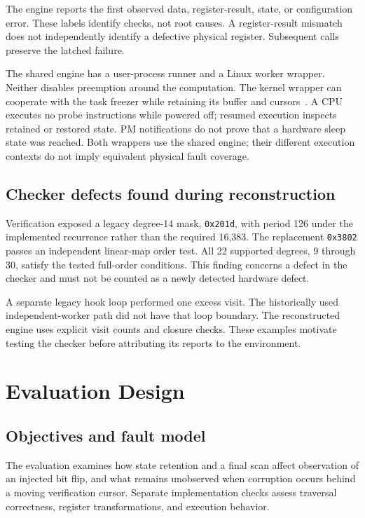 \documentclass[10pt,twocolumn,letterpaper]{article}
\newcommand{\code}[1]{\texttt{#1}}
\begin{document}
The engine reports the first observed data, register-result, state, or configuration error. These labels identify checks, not root causes. A register-result mismatch does not independently identify a defective physical register. Subsequent calls preserve the latched failure.

The shared engine has a user-process runner and a Linux worker wrapper. Neither disables preemption around the computation. The kernel wrapper can cooperate with the task freezer while retaining its buffer and cursors~\cite{linuxfreezer}. A CPU executes no probe instructions while powered off; resumed execution inspects retained or restored state. PM notifications do not prove that a hardware sleep state was reached. Both wrappers use the shared engine; their different execution contexts do not imply equivalent physical fault coverage.

\subsection{Checker defects found during reconstruction}
Verification exposed a legacy degree-14 mask, \code{0x201d}, with period 126 under the implemented recurrence rather than the required 16,383. The replacement \code{0x3802} passes an independent linear-map order test. All 22 supported degrees, 9 through 30, satisfy the tested full-order conditions. This finding concerns a defect in the checker and must not be counted as a newly detected hardware defect.

A separate legacy hook loop performed one excess visit. The historically used independent-worker path did not have that loop boundary. The reconstructed engine uses explicit visit counts and closure checks. These examples motivate testing the checker before attributing its reports to the environment.

\section{Evaluation Design}
\subsection{Objectives and fault model}
The evaluation examines how state retention and a final scan affect observation of an injected bit flip, and what remains unobserved when corruption occurs behind a moving verification cursor. Separate implementation checks assess traversal correctness, register transformations, and execution behavior.
\end{document}
